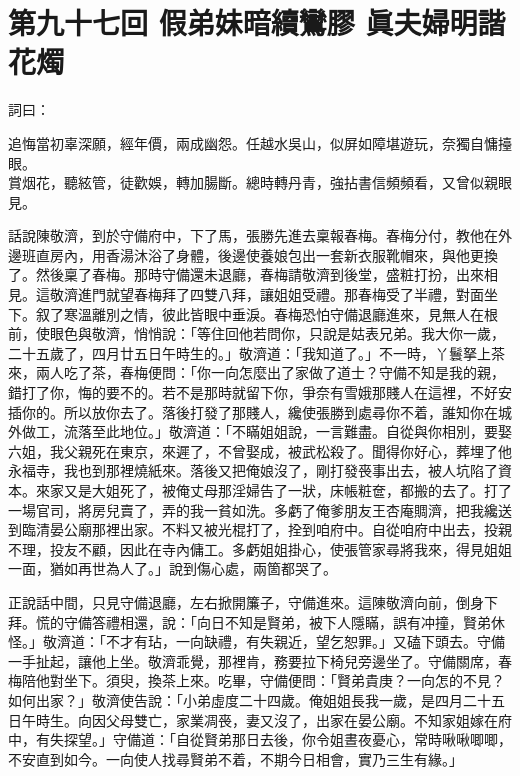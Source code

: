 
\chapter*{第九十七回 假弟妹暗續鸞膠 眞夫婦明諧花燭}


詞曰：

\begin{myquote}
追悔當初辜深願，經年價，兩成幽怨。任越水吳山，似屏如障堪遊玩，奈獨自慵擡眼。\\賞烟花，聽絃管，徒歡娛，轉加腸斷。總時轉丹青，強拈書信頻頻看，又曾似親眼見。
\end{myquote}

話說陳敬濟，到於守備府中，下了馬，張勝先進去稟報春梅。春梅分付，教他在外邊班直房內，用香湯沐浴了身體，後邊使養娘包出一套新衣服靴帽來，與他更換了。然後稟了春梅。那時守備還未退廳，春梅請敬濟到後堂，盛粧打扮，出來相見。這敬濟進門就望春梅拜了四雙八拜，讓姐姐受禮。那春梅受了半禮，對面坐下。叙了寒溫離別之情，彼此皆眼中垂淚。春梅恐怕守備退廳進來，見無人在根前，使眼色與敬濟，{}悄悄說：「等住回他若問你，只說是姑表兄弟。我大你一歲，二十五歲了，四月廿五日午時生的。」敬濟道：「我知道了。」不一時，丫鬟拏上茶來，兩人吃了茶，春梅便問：「你一向怎麼出了家做了道士？守備不知是我的親，錯打了你，悔的要不的。若不是那時就留下你，爭奈有雪娥那賤人在這裡，不好安插你的。{}所以放你去了。落後打發了那賤人，纔使張勝到處尋你不着，誰知你在城外做工，流落至此地位。」敬濟道：「不瞞姐姐說，一言難盡。自從與你相別，要娶六姐，我父親死在東京，來遲了，不曾娶成，被武松殺了。聞得你好心，葬埋了他永福寺，我也到那裡燒紙來。落後又把俺娘沒了，剛打發䘮事出去，被人坑陷了資本。{}來家又是大姐死了，被俺丈母那淫婦告了一狀，{}床帳粧奩，都搬的去了。打了一場官司，將房兒賣了，弄的我一貧如洗。多虧了俺爹朋友王杏庵賙濟，把我纔送到臨清晏公廟那裡出家。不料又被光棍打了，拴到咱府中。自從咱府中出去，投親不理，投友不顧，因此在寺內傭工。多虧姐姐掛心，使張管家尋將我來，得見姐姐一面，猶如再世為人了。」{}說到傷心處，兩箇都哭了。

正說話中間，只見守備退廳，左右掀開簾子，守備進來。這陳敬濟向前，倒身下拜。慌的守備答禮相還，說：「向日不知是賢弟，被下人隱瞞，誤有冲撞，賢弟休怪。」敬濟道：「不才有玷，一向缺禮，有失親近，望乞恕罪。」又磕下頭去。守備一手扯起，讓他上坐。敬濟乖覺，那裡肯，務要拉下椅兒旁邊坐了。守備關席，春梅陪他對坐下。須臾，換茶上來。吃畢，守備便問：「賢弟貴庚？一向怎的不見？如何出家？」敬濟使告說：「小弟虛度二十四歲。俺姐姐長我一歲，是四月二十五日午時生。向因父母雙亡，家業凋䘮，妻又沒了，出家在晏公廟。不知家姐嫁在府中，有失探望。」守備道：「自從賢弟那日去後，你令姐晝夜憂心，常時啾啾唧唧，不安直到如今。{}一向使人找尋賢弟不着，不期今日相會，實乃三生有緣。」

